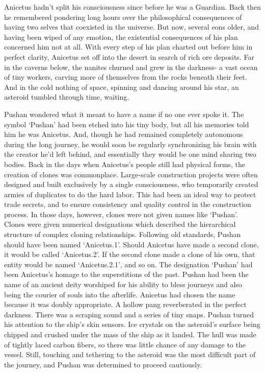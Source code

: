 \documentclass[a4paper]{article}
\begin{document}
Anicetus hadn’t split his consciousness since before he was a Guardian. Back then he remembered pondering long hours over the philosophical consequences of having two selves that coexisted in the universe. But now, several eons older, and having been wiped of any emotion, the existential consequences of his plan concerned him not at all.
With every step of his plan charted out before him in perfect clarity, Anicetus set off into the desert in search of rich ore deposits. Far in the caverns below, the nanites churned and grew in the darkness- a vast ocean of tiny workers, carving more of themselves from the rocks beneath their feet. And in the cold nothing of space, spinning and dancing around his star, an asteroid tumbled through time, waiting.

Pushan wondered what it meant to have a name if no one ever spoke it. The symbol ‘Pushan’ had been etched into his tiny body, but all his memories told him he was Anicetus. And, though he had remained completely autonomous during the long journey, he would soon be regularly synchronizing his brain with the creator he’d left behind, and essentially they would be one mind sharing two bodies.
Back in the days when Anicetus’s people still had physical forms, the creation of clones was commonplace. Large-scale construction projects were often designed and built exclusively by a single consciousness, who temporarily created armies of duplicates to do the hard labor. This had been an ideal way to protect trade secrets, and to ensure consistency and quality control in the construction process.
In those days, however, clones were not given names like ‘Pushan’. Clones were given numerical designations which described the hierarchical structure of complex cloning relationships. Following old standards, Pushan should have been named ‘Anicetus.1’. Should Anicetus have made a second clone, it would be called ‘Anicetus.2’. If the second clone made a clone of his own, that entity would be named ‘Anicetus.2.1’, and so on.
The designation ‘Pushan’ had been Anicetus’s homage to the superstitions of the past. Pushan had been the name of an ancient deity worshiped for his ability to bless journeys and also being the courier of souls into the afterlife. Anicetus had chosen the name because it was doubly appropriate.
A hollow pang reverberated in the perfect darkness. There was a scraping sound and a series of tiny snaps. Pushan turned his attention to the ship’s skin sensors. Ice crystals on the asteroid’s surface being chipped and crushed under the mass of the ship as it landed. The hull was made of tightly laced carbon fibers, so there was little chance of any damage to the vessel. Still, touching and tethering to the asteroid was the most difficult part of the journey, and Pushan was determined to proceed cautiously.
\end{document}
